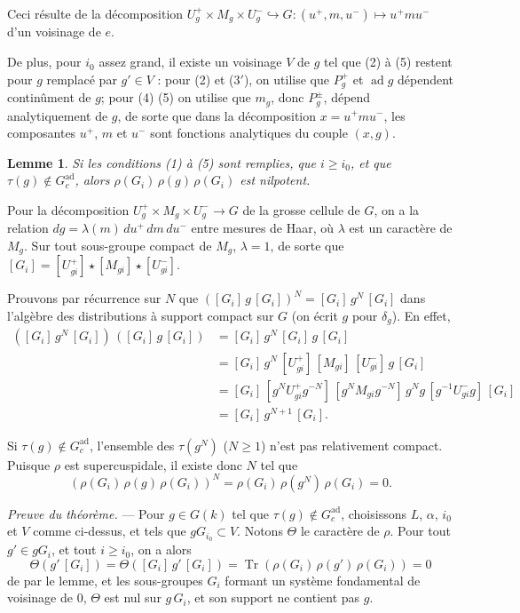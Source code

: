 \documentclass[10pt,a4paper]{amsart}
\theoremstyle{plain}
\newtheorem{lemme}{Lemme}
\theoremstyle{remark}
\DeclareMathOperator{\Tr}{Tr}
\DeclareMathOperator{\ad}{ad}
\begin{document}
Ceci résulte de la décomposition $U_g^+ \times M_g \times U_g^- \hookrightarrow G :
(u^+, m, u^-) \mapsto u^+ m u^-$ d'un voisinage de $e$.

De plus, pour $i_0$ assez grand, il existe un voisinage $V$ de $g$ tel que (2) à (5)
restent pour $g$ remplacé par $g' \in V$ : pour (2) et (3$'$), on utilise que $P_g^+$ et
$\ad g$ dépendent continûment de $g$; pour (4) (5) on utilise que $m_g$, donc $P_g^{\pm}$,
dépend analytiquement de $g$, de sorte que dans la décomposition $x = u^+ m u^-$,
les composantes $u^+$, $m$ et $u^-$ sont fonctions analytiques du couple $(x, g)$.

\begin{lemme}
Si les conditions (1) à (5) sont remplies, que $i \ge i_0$, et que
$\tau(g) \notin G_c^{\mathrm{ad}}$, alors $\rho(G_i)\, \rho(g)\, \rho(G_i)$ est nilpotent.
\end{lemme}

Pour la décomposition $U_g^+ \times M_g \times U_g^- \to G$ de la grosse cellule de $G$,
on a la relation $dg = \lambda(m)\, du^+\, dm\, du^-$ entre mesures de Haar, où $\lambda$
est un caractère de $M_g$. Sur tout sous-groupe compact de $M_g$, $\lambda = 1$, de sorte que
$[G_i] = [U_{gi}^+] \star [M_{gi}] \star [U_{gi}^-]$.

Prouvons par récurrence sur $N$ que $([G_i]\, g\, [G_i])^N = [G_i]\, g^N\, [G_i]$ dans
l'algèbre des distributions à support compact sur $G$ (on écrit $g$ pour $\delta_g$). En effet,
\begin{align*}
([G_i]\, g^N\, [G_i])\, ([G_i]\, g\, [G_i])
&= [G_i]\, g^N\, [G_i]\, g\, [G_i] \\
&= [G_i]\, g^N\, [U_{gi}^+]\, [M_{gi}]\, [U_{gi}^-]\, g\, [G_i] \\
&= [G_i]\, [g^N U_{gi}^+ g^{-N}]\, [g^N M_{gi} g^{-N}]\, g^N g\,
[g^{-1} U_{gi}^- g]\, [G_i] \\
&= [G_i]\, g^{N+1}\, [G_i].
\end{align*}

\vspace{1ex}

Si $\tau(g) \notin G_c^{\mathrm{ad}}$, l'ensemble des $\tau(g^N)$ ($N \ge 1$) n'est pas relativement
compact. Puisque $\rho$ est supercuspidale, il existe donc $N$ tel que
\[
(\rho(G_i)\, \rho(g)\, \rho(G_i))^N = \rho(G_i)\, \rho(g^N)\, \rho(G_i) = 0.
\]

\textit{Preuve du théorème.} --- Pour $g \in G(k)$ tel que $\tau(g) \notin G_c^{\mathrm{ad}}$,
choisissons $L$, $\alpha$, $i_0$ et $V$ comme ci-dessus, et tels que $g G_{i_0} \subset V$.
Notons $\Theta$ le caractère de $\rho$. Pour tout $g' \in g G_i$, et tout $i \ge i_0$, on a alors
\[
\Theta(g'\, [G_i]) = \Theta([G_i]\, g'\, [G_i]) = \Tr(\rho(G_i)\, \rho(g')\, \rho(G_i)) = 0
\]
de par le lemme, et les sous-groupes $G_i$ formant un système fondamental de voisinage
de $0$, $\Theta$ est nul sur $g\, G_i$, et son support ne contient pas $g$.
\end{document}
